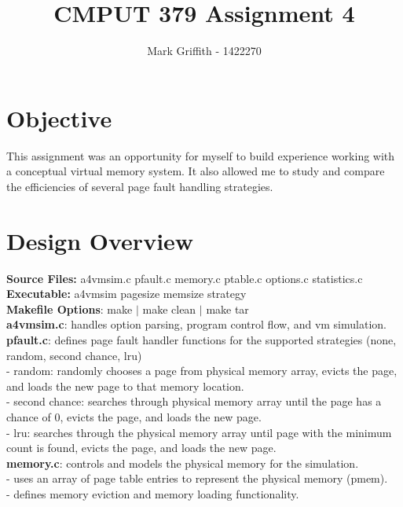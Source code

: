\documentclass{article}
\begin{document}
\title{CMPUT 379 Assignment 4}
\author{Mark Griffith - 1422270}

\maketitle

\section{Objective}
This assignment was an opportunity for myself to build experience
working with a conceptual virtual memory system. It also allowed me to
study and compare the efficiencies of several page fault handling strategies.

\section{Design Overview}

\textbf{Source Files:} a4vmsim.c pfault.c memory.c ptable.c options.c statistics.c \\
\textbf{Executable:} a4vmsim pagesize memsize strategy\\
\textbf{Makefile Options}: make $|$ make clean $|$ make tar \\

\noindent
\textbf{a4vmsim.c}: handles option parsing, program control flow, and vm simulation. \\

\noindent
\textbf{pfault.c}: defines page fault handler functions for the supported strategies
(none, random, second chance, lru) \\
- random: randomly chooses a page from physical memory array, evicts the page, and loads the new page
to that memory location. \\
- second chance: searches through physical memory array until the page has a chance of 0,
evicts the page, and loads the new page. \\
- lru: searches through the physical memory array until page with the minimum count is found,
evicts the page, and loads the new page. \\

\noindent
\textbf{memory.c}: controls and models the physical memory for the simulation. \\
- uses an array of page table entries to represent the physical memory (pmem). \\
- defines memory eviction and memory loading functionality. \\
\end{document}
